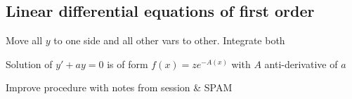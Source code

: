 \newsectionNoPB
\subsection{Linear differential equations of first order}
 Move all $y$ to one side and all other vars to other. Integrate both

\shortproposition Solution of $y' + ay = 0$ is of form $f(x) = z e^{-A(x)}$ with $A$ anti-derivative of $a$

\TODO Improve procedure with notes from session \& SPAM
